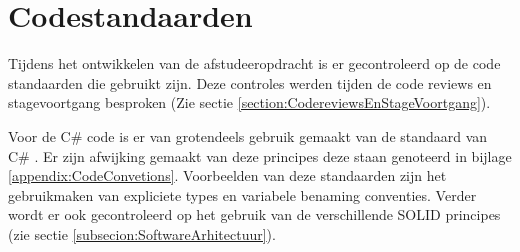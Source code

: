 \section{Codestandaarden}
Tijdens het ontwikkelen van de afstudeeropdracht is er gecontroleerd op de code standaarden die gebruikt zijn.
Deze controles werden tijden de code reviews en stagevoortgang besproken (Zie sectie \ref{section:CodereviewsEnStageVoortgang}).

\whitespace
Voor de C\# code is er van grotendeels gebruik gemaakt van de standaard  van C\# \parencite{CodestandaardCSharp}.  
Er zijn afwijking gemaakt van deze principes deze staan genoteerd in bijlage \ref{appendix:CodeConvetions}.
Voorbeelden van deze standaarden zijn het gebruikmaken van expliciete types en variabele benaming conventies.
Verder wordt er ook gecontroleerd op het gebruik van de verschillende SOLID principes (zie sectie \ref{subsecion:SoftwareArhitectuur}).
%
%
%
